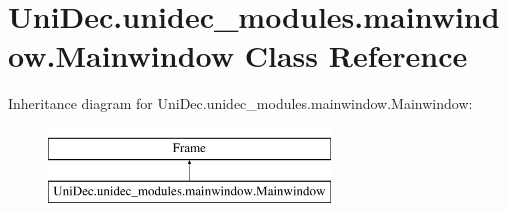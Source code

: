 \hypertarget{class_uni_dec_1_1unidec__modules_1_1mainwindow_1_1_mainwindow}{}\section{Uni\+Dec.\+unidec\+\_\+modules.\+mainwindow.\+Mainwindow Class Reference}
\label{class_uni_dec_1_1unidec__modules_1_1mainwindow_1_1_mainwindow}
Inheritance diagram for Uni\+Dec.\+unidec\+\_\+modules.\+mainwindow.\+Mainwindow\+:\begin{figure}[H]
\begin{center}
\leavevmode
\includegraphics[height=2.000000cm]{class_uni_dec_1_1unidec__modules_1_1mainwindow_1_1_mainwindow}
\end{center}
\end{figure}

